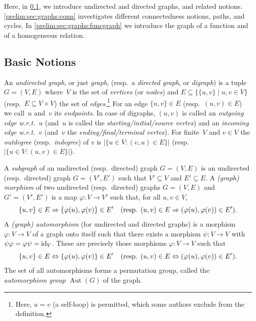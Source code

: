 
Here, in \cref{prelim:sec:graphs:notions}, we introduce undirected and directed graphs, 
and related notions. \cref{prelim:sec:graphs:conn} 
investigates different connectedness notions, paths, and cycles.
In \cref{prelim:sec:graphs:funcgraph} we
introduce the graph of a function and of a homogeneous relation.

\subsection{Basic Notions}
\label{prelim:sec:graphs:notions}

An \emph{undirected graph}, or just \emph{graph}, (resp.~a \emph{directed graph}, or \emph{digraph})
is a tuple $G = (V, E)$ where~$V$ is the set of \emph{vertices} (or \emph{nodes}) 
and $E \subseteq \{ \{u,v\} \mid u,v \in V \}$
(resp.~$E \subseteq V \times V$)
the set of \emph{edges}.\footnote{Here, $u = v$ (a self-loop) is permitted, which some authors exclude from the definition.} 
For an edge $\{ u,v \} \in E$ (resp.~$(u,v) \in E$)
we call~$u$ and~$v$ its \emph{endpoints}. 
In case of digraphs, $(u,v)$ is called an \emph{outgoing edge w.r.t.~$u$} (and~$u$ is called the \emph{starting/initial/source vertex})
and an \emph{incoming edge w.r.t.~$v$} (and~$v$ the \emph{ending/final/terminal vertex}).
For finite~$V$ and $v \in V$ 
the \emph{outdegree} (resp.~\emph{indegree})
of $v$ is $|\{ u \in V : (v,u) \in E \}|$ (resp.~$|\{ u \in V : (u,v) \in E \}|$).

\label{def:AutG}
A \emph{subgraph} of an undirected (resp.~directed) graph $G = (V,E)$
is an undirected (resp.~directed) graph $G = (V', E')$
such that $V' \subseteq V$ and $E' \subseteq E$.
A \emph{(graph) morphism} of two undirected (resp.~directed)
graphs $G = (V,E)$ and $G' = (V', E')$
is a map $\varphi \colon V \to V'$
such that, for all $u,v \in V$,
\[
\{ u,v \} \in E \Rightarrow \{ \varphi(u), \varphi(v) \} \in E'
\quad (\text{resp. } (u,v) \in E \Rightarrow (\varphi(u), \varphi(v)) \in E').
\] 
A \emph{(graph) automorphism} (for undirected and directed graphs)
is a morphism $\varphi \colon V \to V$ 
of a graph onto itself such that there exists a morphism $\psi \colon V \to V$
with $\psi \varphi = \varphi \psi = \operatorname{id}_V$.
These are precisely those morphisms $\varphi \colon V \to V$ such
that 
\[
\{ u,v \} \in E \Leftrightarrow \{ \varphi(u), \varphi(v) \} \in E'
\quad (\text{resp. } (u,v) \in E \Leftrightarrow (\varphi(u), \varphi(v)) \in E').
\] 
The set of all automorphisms forms a permutation group, called 
the \emph{automorphism group} $\operatorname{Aut}(G)$ of the graph.

